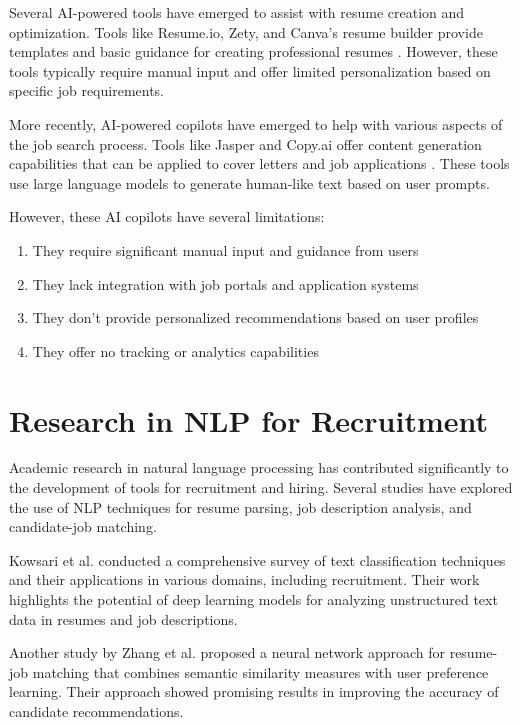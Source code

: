 \documentclass[12pt,a4paper]{report}
\begin{document}
Several AI-powered tools have emerged to assist with resume creation and optimization. Tools like Resume.io, Zety, and Canva's resume builder provide templates and basic guidance for creating professional resumes \cite{resumeio2022, zety2022, canva2022}. However, these tools typically require manual input and offer limited personalization based on specific job requirements.

More recently, AI-powered copilots have emerged to help with various aspects of the job search process. Tools like Jasper and Copy.ai offer content generation capabilities that can be applied to cover letters and job applications \cite{jasper2022, copyai2022}. These tools use large language models to generate human-like text based on user prompts.

However, these AI copilots have several limitations:
\begin{enumerate}
    \item They require significant manual input and guidance from users
    \item They lack integration with job portals and application systems
    \item They don't provide personalized recommendations based on user profiles
    \item They offer no tracking or analytics capabilities
\end{enumerate}

\section*{Research in NLP for Recruitment}

Academic research in natural language processing has contributed significantly to the development of tools for recruitment and hiring. Several studies have explored the use of NLP techniques for resume parsing, job description analysis, and candidate-job matching.

Kowsari et al. \cite{kowsari2019} conducted a comprehensive survey of text classification techniques and their applications in various domains, including recruitment. Their work highlights the potential of deep learning models for analyzing unstructured text data in resumes and job descriptions.

Another study by Zhang et al. \cite{zhang2020} proposed a neural network approach for resume-job matching that combines semantic similarity measures with user preference learning. Their approach showed promising results in improving the accuracy of candidate recommendations.
\end{document}
